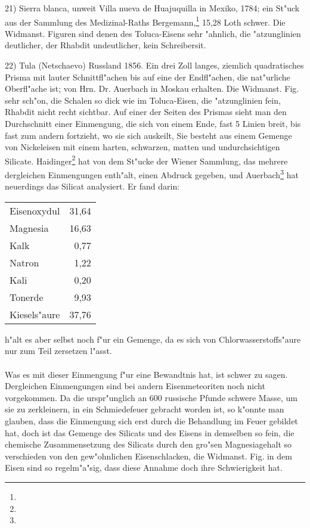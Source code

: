 \documentclass[a4paper, 11pt, oneside]{article}
\begin{document}
21) Sierra blanca, unweit Villa nueva de Huajuquilla in Mexiko, 1784; ein St"uck aus der Sammlung des Medizinal-Raths Bergemann,\footnote{} 15,28 Loth schwer. Die Widmanst. Figuren sind denen des Toluca-Eisens sehr "ahnlich, die "atzunglinien deutlicher, der Rhabdit undeutlicher, kein Schreibersit.

22) Tula (Netschaevo) Russland 1856. Ein drei Zoll langes, ziemlich quadratisches Prisma mit lauter Schnittfl"achen bis auf eine der Endfl"achen, die nat"urliche Oberfl"ache ist; von Hrn. Dr. Auerbach in Moskau erhalten. Die Widmanst. Fig. sehr sch"on, die Schalen so dick wie im Toluca-Eisen, die "atzunglinien fein, Rhabdit nicht recht sichtbar. Auf einer der Seiten des Prismas sieht man den Durchschnitt einer Einmengung, die sich von einem Ende, fast 5 Linien breit, bis fast zum andern fortzieht, wo sie sich auskeilt, Sie besteht aus einem Gemenge von Nickeleisen mit einem harten, schwarzen, matten und undurchsichtigen Silicate. Haidinger\footnote{} hat von dem St"ucke der Wiener Sammlung, das mehrere dergleichen Einmengungen enth"alt, einen Abdruck gegeben, und Auerbach\footnote{} hat neuerdings das Silicat analysiert. Er fand darin:
\begin{center}
\begin{tabular}{ l r }
    Eisenoxydul & 31,64\\
    Magnesia & 16,63\\
    Kalk & 0,77\\
    Natron & 1,22\\
    Kali & 0,20\\
    Tonerde & 9,93\\
    Kiesels"aure & 37,76\\
\end{tabular}
\end{center}
h"alt es aber selbst noch f"ur ein Gemenge, da es sich von Chlorwasserstoffs"aure nur zum Teil zersetzen l"asst.
\paragraph{}
Was es mit dieser Einmengung f"ur eine Bewandtnis hat, ist schwer zu sagen. Dergleichen Einmengungen sind bei andern Eisenmeteoriten noch nicht vorgekommen. Da die urspr"unglich an 600 russische Pfunde schwere Masse, um sie zu zerkleinern, in ein Schmiedefeuer gebracht worden ist, so k"onnte man glauben, dass die Einmengung sich erst durch die Behandlung im Feuer gebildet hat, doch ist das Gemenge des Silicats und des Eisens in demselben so fein, die chemische Zusammensetzung des Silicats durch den gro"sen Magnesiagehalt so verschieden von den gew"ohnlichen Eisenschlacken, die Widmanst. Fig. in dem Eisen sind so regelm"a"sig, dass diese Annahme doch ihre Schwierigkeit hat.
\end{document}
